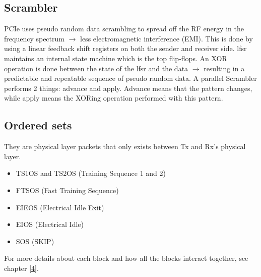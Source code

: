 \subsection{Scrambler}
PCIe uses pseudo random data scrambling to spread off the RF energy in the frequency spectrum $\longrightarrow$ less electromagnetic interference (EMI). This is done by using a linear feedback shift registers on both the sender and receiver side. lfsr maintains an internal state machine which is the top flip-flops. An XOR operation is done between the state of the lfsr and the data $\longrightarrow$ resulting in a predictable and repeatable sequence of pseudo random data.
A parallel Scrambler performs 2 things: advance and apply. Advance means that the pattern changes, while apply means the XORing operation performed with this pattern.
\subsection{Ordered sets}
They are physical layer packets that only exists between Tx and Rx's physical layer.
\begin{itemize}
    \item TS1OS and TS2OS (Training Sequence 1 and 2)
    \item FTSOS (Fast Training Sequence)
    \item EIEOS (Electrical Idle Exit)
    \item EIOS (Electrical Idle)
    \item SOS (SKIP)
\end{itemize}
For more details about each block and how all the blocks interact together, see chapter \ref{4}.




